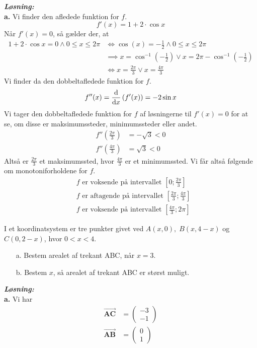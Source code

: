 \documentclass{article}
\newcommand{\sol}{\setlength{\parindent}{0cm}\textbf{\textit{Løsning:}}\setlength{\parindent}{1cm}}
\begin{document}
\sol \\ 
\textbf{a.}
Vi finder den afledede funktion for $f$.
\[
f'(x)=1+2\cdot \cos x
\] 
Når $f'(x)=0$, så gælder der, at
\begin{equation*}
\begin{split}
  1+2\cdot \cos x=0 \land 0\leq x \leq 2\pi &\iff \cos(x)=-\frac{1}{2}\land 0\leq x \leq 2\pi \\ 
  &\implies x=\cos^{-1}\left(-\frac{1}{2}\right) \lor x=2\pi - \cos^{-1}\left(-\frac{1}{2}\right) \\ 
  &\iff x=\frac{2\pi}{3}\lor x=\frac{4\pi}{3}
\end{split}
\end{equation*}
Vi finder da den dobbeltafledede funktion for $f$.
\[
f''(x)=\dv{x} \left(f'(x)\right) =-2\sin x
\] 
Vi tager den dobbeltafledede funktion for $f$ af løsningerne til $f'(x)=0$ for at se, om disse er maksimumssteder, minimumssteder eller andet. 
\begin{equation*}
\begin{split}
  f''\left(\frac{2\pi}{3}\right)&=-\sqrt{3} <0 \\ 
  f''\left(\frac{4\pi}{3}\right)&=\sqrt{3} <0
\end{split}
\end{equation*}
Altså er $\frac{2\pi}{3}$ et maksimumssted, hvor $\frac{4\pi}{3}$ er et minimumssted. 
Vi får altså følgende om monotoniforholdene for $f$.
\begin{equation*}
\begin{split}
  &f \text{ er voksende på intervallet } \left[0;\frac{2\pi}{3}\right]\\ 
  &f \text{ er aftagende på intervallet } \left[\frac{2\pi}{3};\frac{4\pi}{3}\right] \\ 
  &f \text{ er voksende på intervallet } \left[\frac{4\pi}{3};2\pi\right]
\end{split}
\end{equation*}
\begin{question}{}{}
  I et koordinatsystem er tre punkter givet ved $A(x,0),\;B(x,4-x)$ og $C(0,2-x)$, hvor $0<x<4$.
  \begin{itemize}
    \item[a.] Bestem arealet af trekant ABC, når $x=3$.
    \item[b.] Bestem $x$, så arealet af trekant ABC er størst muligt. 
  \end{itemize}
\end{question}
\sol \\ 
\textbf{a.} 
Vi har
\begin{equation*}
\begin{split}
  \overrightarrow{\textbf{AC}} &=\begin{pmatrix} -3\\ -1 \end{pmatrix}\\ 
    \overrightarrow{\textbf{AB}} &= \begin{pmatrix} 0 \\1  \end{pmatrix} 
\end{split}
\end{equation*}
\end{document}
